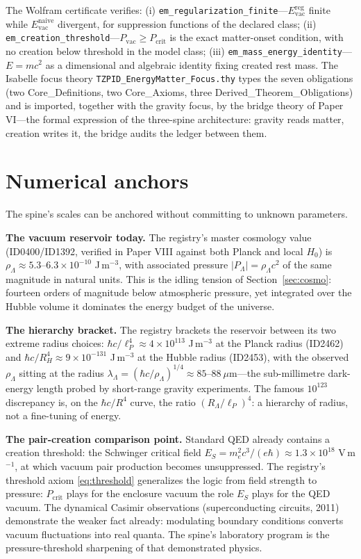 \documentclass[11pt]{article}
\theoremstyle{remark}
\begin{document}
The Wolfram certificate verifies: (i) \texttt{em\_regularization\_finite}---$E^{\mathrm{reg}}_{\mathrm{vac}}$ finite while $E^{\mathrm{naive}}_{\mathrm{vac}}$ divergent, for suppression functions of the declared class; (ii) \texttt{em\_creation\_threshold}---$P_{\mathrm{vac}} \geq P_{\mathrm{crit}}$ is the exact matter-onset condition, with no creation below threshold in the model class; (iii) \texttt{em\_mass\_energy\_identity}---$E = mc^2$ as a dimensional and algebraic identity fixing created rest mass. The Isabelle focus theory \texttt{TZPID\_EnergyMatter\_Focus.thy} types the seven obligations (two Core\_Definitions, two Core\_Axioms, three Derived\_Theorem\_Obligations) and is imported, together with the gravity focus, by the bridge theory of Paper VI---the formal expression of the three-spine architecture: gravity reads matter, creation writes it, the bridge audits the ledger between them.

\section{Numerical anchors}
\label{sec:numbers}

The spine's scales can be anchored without committing to unknown parameters.

\textbf{The vacuum reservoir today.} The registry's master cosmology value (ID0400/ID1392, verified in Paper VIII against both Planck and local $H_0$) is $\rho_\Lambda \approx 5.3$--$6.3 \times 10^{-10}$ J\,m$^{-3}$, with associated pressure $|P_\Lambda| = \rho_\Lambda c^2$ of the same magnitude in natural units. This is the idling tension of Section~\ref{sec:cosmo}: fourteen orders of magnitude below atmospheric pressure, yet integrated over the Hubble volume it dominates the energy budget of the universe.

\textbf{The hierarchy bracket.} The registry brackets the reservoir between its two extreme radius choices: $\hbar c/\ell_P^4 \approx 4 \times 10^{113}$ J\,m$^{-3}$ at the Planck radius (ID2462) and $\hbar c/R_H^4 \approx 9 \times 10^{-131}$ J\,m$^{-3}$ at the Hubble radius (ID2453), with the observed $\rho_\Lambda$ sitting at the radius $\lambda_\Lambda = (\hbar c/\rho_\Lambda)^{1/4} \approx 85$--$88\ \mu$m---the sub-millimetre dark-energy length probed by short-range gravity experiments. The famous $10^{123}$ discrepancy is, on the $\hbar c/R^4$ curve, the ratio $(R_\Lambda/\ell_P)^4$: a hierarchy of radius, not a fine-tuning of energy.

\textbf{The pair-creation comparison point.} Standard QED already contains a creation threshold: the Schwinger critical field $E_S = m_e^2 c^3/(e\hbar) \approx 1.3 \times 10^{18}$ V\,m$^{-1}$, at which vacuum pair production becomes unsuppressed. The registry's threshold axiom \eqref{eq:threshold} generalizes the logic from field strength to pressure: $P_{\mathrm{crit}}$ plays for the enclosure vacuum the role $E_S$ plays for the QED vacuum. The dynamical Casimir observations (superconducting circuits, 2011) demonstrate the weaker fact already: modulating boundary conditions converts vacuum fluctuations into real quanta. The spine's laboratory program is the pressure-threshold sharpening of that demonstrated physics.
\end{document}
